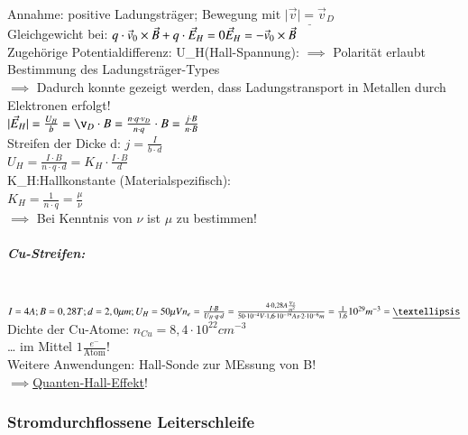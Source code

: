         Annahme: positive Ladungsträger; Bewegung mit $\underline{\vert \vec{v}\vert=\vec{v}_D}$\\
        Gleichgewicht bei: $q\cdot \vec{v}_0\times \vec{B}+q\cdot\vec{E}_H=0\\ \vec{E}_H=-\vec{v}_0\times\vec{B}$\\
        
        Zugehörige Potentialdifferenz: U_H(Hall-Spannung):
        $\implies$ Polarität erlaubt Bestimmung des Ladungsträger-Types\\
        $\implies$ Dadurch konnte gezeigt werden, dass Ladungstransport in Metallen durch Elektronen erfolgt!\\
        
        $\vert \vec{E}_H\vert=\frac{U_H}{b}=\v_D\cdot B=\frac{n\cdot q\cdot v_D}{n\cdot q}\cdot B=\frac{j\cdot B}{n\cdot B}$\\
        
        Streifen der Dicke d: $j=\frac{I}{b\cdot d}$\\
        
        $U_H=\frac{I\cdot B}{n\cdot q\cdot d}=K_H\cdot\frac{I\cdot B}{d}$\\
        
        K_H:Hallkonstante (Materialspezifisch):\\
        $\boxed{K_H=\frac{1}{n\cdot q}=\frac{\mu}{\nu}}$\\
        
        $\implies$ Bei Kenntnis von $\nu$ ist $\mu$ zu bestimmen!
        
        \subparagraph{Cu-Streifen:}\leavevmode \\
        
        $I=4A; B=0,28T; d=2,0\mu m; U_H=50\mu V\\
        n_e=\frac{I\cdot B}{U_H\cdot q\cdot d}=\frac{4\cdot 0,28 A\frac{Vs}{m^2}}{50\cdot 10^{-4}V\cdot 1,6\cdot 10^{-19}As\cdot 2\cdot 10^{-6}m}\\
        =\frac{1}{1,6}10^{29}m^{-3}\\
        =\underline{…}$\\
        
        Dichte der Cu-Atome: $n_{Cu}=8,4\cdot 10^{22}cm^{-3}$\\
        … im Mittel $1\frac{e^-}{\text{Atom}}!$\\
        Weitere Anwendungen: Hall-Sonde zur MEssung von B!\\
        $\implies$\underline{Quanten-Hall-Effekt}!\\
        
        \subsubsection{Stromdurchflossene Leiterschleife}\leavevmode \\
        
        
        
        
        
        
        
        
        
        
        
        
        
        
        
        
        
\newpage  